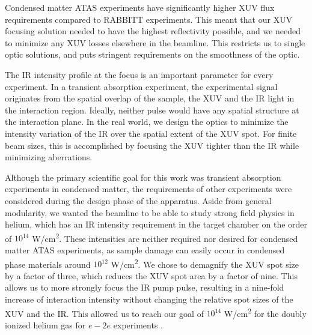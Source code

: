 Condensed matter ATAS experiments have significantly higher XUV flux requirements compared to RABBITT experiments. This meant that our XUV focusing solution needed to have the highest reflectivity possible, and we needed to minimize any XUV losses elsewhere in the beamline. This restricts us to single optic solutions, and puts stringent requirements on the smoothness of the optic.

The IR intensity profile at the focus is an important parameter for every experiment. In a transient absorption experiment, the experimental signal originates from the spatial overlap of the sample, the XUV and the IR light in the interaction region. Ideally, neither pulse would have any spatial structure at the interaction plane. In the real world, we design the optics to minimize the intensity variation of the IR over the spatial extent of the XUV spot. For finite beam sizes, this is accomplished by focusing the XUV tighter than the IR while minimizing aberrations.

Although the primary scientific goal for this work was transient absorption experiments in condensed matter, the requirements of other experiments were considered during the design phase of the apparatus. Aside from general modularity, we wanted the beamline to be able to study strong field physics in helium, which has an IR intensity requirement in the target chamber on the order of $10^{14}$ W/cm\textsuperscript{2}. These intensities are neither required nor desired for condensed matter ATAS experiments, as sample damage can easily occur in condensed phase materials around  $10^{12}$ W/cm\textsuperscript{2}. We chose to demagnify the XUV spot size by a factor of three, which reduces the XUV spot area by a factor of nine. This allows us to more strongly focus the IR pump pulse, resulting in a nine-fold increase of interaction intensity without changing the relative spot sizes of the XUV and the IR. This allowed us to reach our goal of $10^{14}$ W/cm\textsuperscript{2} for the doubly ionized helium gas for $e-2e$ experiments \cite{kiesewetterDynamicsNearThresholdAttosecond2019}.


